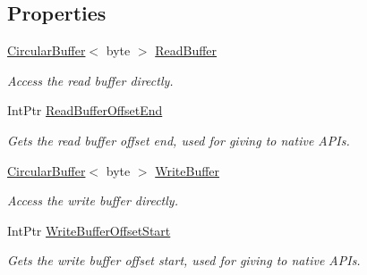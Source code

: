 \subsection*{Properties}
\begin{DoxyCompactItemize}
\item 
\mbox{\hyperlink{class_r_j_c_p_1_1_datastructures_1_1_circular_buffer}{Circular\+Buffer}}$<$ byte $>$ \mbox{\hyperlink{interface_r_j_c_p_1_1_i_o_1_1_ports_1_1_native_1_1_i_serial_buffer_serial_data_ab0445ecad610149042e817879914d5f4}{Read\+Buffer}}
\begin{DoxyCompactList}\small\item\em Access the read buffer directly. \end{DoxyCompactList}\item 
Int\+Ptr \mbox{\hyperlink{interface_r_j_c_p_1_1_i_o_1_1_ports_1_1_native_1_1_i_serial_buffer_serial_data_a7d522974add9e3ece153718b2d571e86}{Read\+Buffer\+Offset\+End}}
\begin{DoxyCompactList}\small\item\em Gets the read buffer offset end, used for giving to native A\+PI\textquotesingle{}s. \end{DoxyCompactList}\item 
\mbox{\hyperlink{class_r_j_c_p_1_1_datastructures_1_1_circular_buffer}{Circular\+Buffer}}$<$ byte $>$ \mbox{\hyperlink{interface_r_j_c_p_1_1_i_o_1_1_ports_1_1_native_1_1_i_serial_buffer_serial_data_aaa31fe19c6af3d38632c6656946d6188}{Write\+Buffer}}
\begin{DoxyCompactList}\small\item\em Access the write buffer directly. \end{DoxyCompactList}\item 
Int\+Ptr \mbox{\hyperlink{interface_r_j_c_p_1_1_i_o_1_1_ports_1_1_native_1_1_i_serial_buffer_serial_data_a0dd0023db053dc50056c18fc5f90132a}{Write\+Buffer\+Offset\+Start}}
\begin{DoxyCompactList}\small\item\em Gets the write buffer offset start, used for giving to native A\+PI\textquotesingle{}s. \end{DoxyCompactList}\item 

\end{DoxyCompactItemize}
